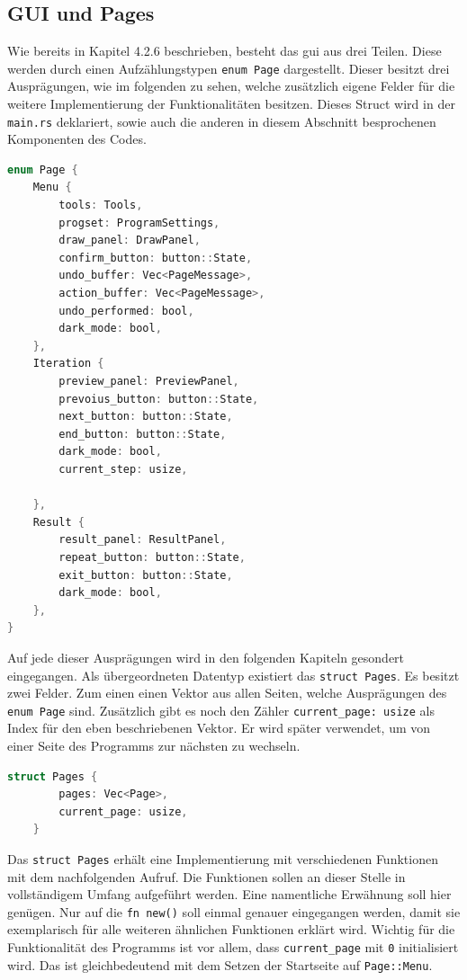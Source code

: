 \subsection{GUI und Pages}
Wie bereits in Kapitel 4.2.6 beschrieben, besteht das \ac{gui} aus drei Teilen. Diese werden durch einen Aufzählungstypen \lstinline{enum Page} dargestellt. Dieser besitzt drei Ausprägungen, wie im folgenden zu sehen, welche zusätzlich eigene Felder für die weitere 
Implementierung der Funktionalitäten besitzen. Dieses Struct wird in der \lstinline{main.rs} deklariert, sowie auch die anderen in diesem Abschnitt besprochenen Komponenten des Codes.

\begin{lstlisting}[language=C]
enum Page {
    Menu { 
        tools: Tools,
        progset: ProgramSettings,
        draw_panel: DrawPanel,
        confirm_button: button::State,
        undo_buffer: Vec<PageMessage>,
        action_buffer: Vec<PageMessage>,
        undo_performed: bool,
        dark_mode: bool,
    },
    Iteration {
        preview_panel: PreviewPanel,
        prevoius_button: button::State,
        next_button: button::State,
        end_button: button::State,
        dark_mode: bool,
        current_step: usize,
        
    },
    Result {
        result_panel: ResultPanel,
        repeat_button: button::State,
        exit_button: button::State,
        dark_mode: bool,
    },
}    
\end{lstlisting}

Auf jede dieser Ausprägungen wird in den folgenden Kapiteln gesondert eingegangen.
Als übergeordneten Datentyp existiert das \lstinline{struct Pages}. 
Es besitzt zwei Felder. Zum einen einen Vektor aus allen Seiten, welche Ausprägungen des \lstinline{enum Page} sind.
Zusätzlich gibt es noch den Zähler  \lstinline{current_page: usize} als Index für den eben beschriebenen Vektor. Er wird später verwendet, um
von einer Seite des Programms zur nächsten zu wechseln.

\begin{lstlisting}[language=C]
    struct Pages {
        pages: Vec<Page>,
        current_page: usize,
    }
\end{lstlisting}

Das \lstinline{struct Pages} erhält eine Implementierung mit verschiedenen Funktionen mit dem nachfolgenden Aufruf.
Die Funktionen sollen an dieser Stelle in vollständigem Umfang aufgeführt werden. Eine namentliche Erwähnung soll hier genügen. 
Nur auf die \lstinline{fn new()} soll einmal genauer eingegangen werden, damit sie exemplarisch für alle weiteren ähnlichen Funktionen erklärt wird.
Wichtig für die Funktionalität des Programms ist vor allem, dass \lstinline{current_page} mit \lstinline{0} initialisiert wird. Das ist gleichbedeutend mit dem Setzen der 
Startseite auf \lstinline{Page::Menu}.

